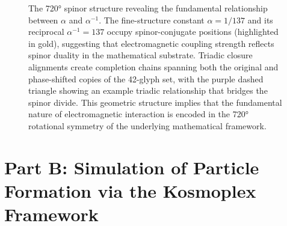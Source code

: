\documentclass[pdflatex,sn-mathphys-num]{sn-jnl}
\theoremstyle{thmstyleone}
\theoremstyle{thmstyletwo}
\theoremstyle{thmstylethree}
\begin{document}
\begin{figure}[ht]

\caption{The 720° spinor structure revealing the fundamental relationship between $\alpha$ and $\alpha^{-1}$. The fine-structure constant $\alpha = 1/137$ and its reciprocal $\alpha^{-1} = 137$ occupy spinor-conjugate positions (highlighted in gold), suggesting that electromagnetic coupling strength reflects spinor duality in the mathematical substrate. Triadic closure alignments create completion chains spanning both the original and phase-shifted copies of the 42-glyph set, with the purple dashed triangle showing an example triadic relationship that bridges the spinor divide. This geometric structure implies that the fundamental nature of electromagnetic interaction is encoded in the 720° rotational symmetry of the underlying mathematical framework.}
\label{fig:alpha_spinor_duality}
\end{figure}


\part*{Part B: Simulation of Particle Formation via the Kosmoplex Framework}
\end{document}
